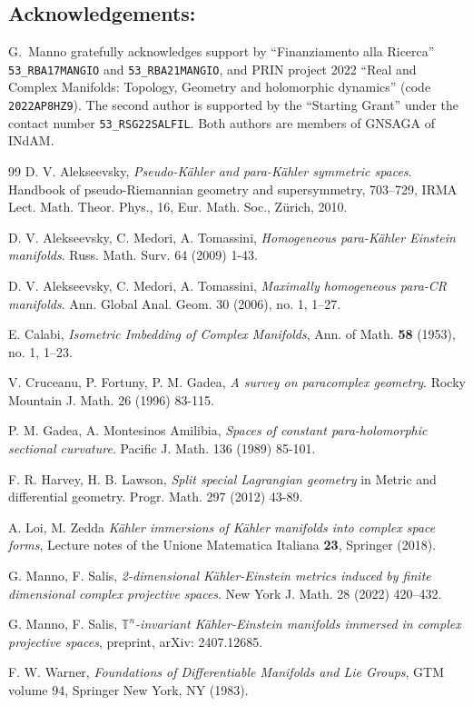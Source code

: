 \documentclass{article}
\begin{document}
\subsection*{Acknowledgements:}

G.~Manno gratefully acknowledges support by  ``Finanziamento alla Ricerca'' \texttt{53\_RBA17MANGIO} and \texttt{53\_RBA21MANGIO},  and PRIN project 2022 ``Real and Complex Manifolds: Topology, Geometry and
holomorphic dynamics'' (code \texttt{2022AP8HZ9}).  The second author is supported by the ``Starting Grant'' under the contact number \texttt{53\_RSG22SALFIL}.  Both authors are members of GNSAGA
of INdAM.  


\begin{thebibliography}{99}
 D. V. Alekseevsky, \emph{ Pseudo-Kähler and para-Kähler symmetric spaces}. Handbook of pseudo-Riemannian geometry and supersymmetry, 703–729, IRMA Lect. Math. Theor. Phys., 16, Eur. Math. Soc., Zürich, 2010.


  D. V.   Alekseevsky, C. Medori, A. Tomassini, 
\emph{Homogeneous para-Kähler Einstein manifolds}. Russ. Math. Surv. 64  (2009) 1-43.

  D. V.   Alekseevsky, C. Medori, A. Tomassini, 
\emph{Maximally homogeneous para-CR manifolds}. Ann. Global Anal. Geom. 30 (2006), no. 1, 1–27. 




 E. Calabi,  \emph{Isometric Imbedding of Complex Manifolds}, Ann. of Math. \textbf{58} (1953), no. 1, 1--23.


  V. Cruceanu, P. Fortuny, P. M.  Gadea, 
\emph{A survey on paracomplex geometry}. Rocky Mountain J. Math. 26 (1996) 83-115.


  P. M. Gadea, A. Montesinos Amilibia,
\emph{Spaces of constant para-holomorphic sectional curvature}. Pacific J. Math. 136 (1989) 85-101.
 
  F. R. Harvey, H. B. Lawson, 
\emph{Split special Lagrangian geometry} in Metric and differential geometry.
Progr. Math. 297 (2012)  43-89.


 A. Loi, M. Zedda \emph{K\"ahler immersions of  K\"ahler manifolds into complex space forms}, Lecture notes of the Unione Matematica Italiana \textbf{23}, Springer (2018).

 G. Manno, F. Salis, 
\emph{2-dimensional Kähler-Einstein metrics induced by finite dimensional
complex projective spaces}. New York J. Math. 28 (2022) 420–432.

 G. Manno, F. Salis, 
\emph{$\mathbb{T}^n$-invariant Kähler-Einstein manifolds immersed in
complex projective spaces}, preprint, arXiv: 2407.12685.

 F. W. Warner, \emph{Foundations of Differentiable Manifolds and Lie Groups}, GTM volume 94, Springer New York, NY (1983).

 

\end{thebibliography}
\end{document}
